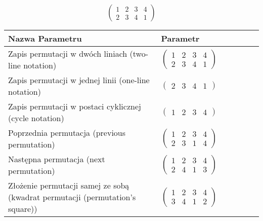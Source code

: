 \documentclass[12pt]{article}
\begin{document}
\subsection{}
\begin{center}
\[
\begin{pmatrix}
	1 & 2 & 3 & 4 \\ 
	2 & 3 & 4 & 1 
\end{pmatrix}
\]

\begin{tabular}{|m{0.6\linewidth}|m{0.4\linewidth}|}
	\hline
	Nazwa Parametru & Parametr \\
	\hline
	Zapis permutacji w dwóch liniach (two-line notation) & $\begin{pmatrix} 1 & 2 & 3 & 4 \\ 
2 & 3 & 4 & 1 \end{pmatrix}$ \\ 
	\hline
	Zapis permutacji w jednej linii (one-line notation) & $\begin{pmatrix} 2 & 3 & 4 & 1 \end{pmatrix}$ \\ 
	\hline
	Zapis permutacji w postaci cyklicznej (cycle notation) & $\begin{pmatrix} 1 & 2 & 3 & 4 \end{pmatrix} $ \\ 
	\hline
	Poprzednia permutacja (previous permutation) & $\begin{pmatrix} 1 & 2 & 3 & 4 \\ 
2 & 3 & 1 & 4 \end{pmatrix}$ \\ 
	\hline
	Następna permutacja (next permutation) & $\begin{pmatrix} 1 & 2 & 3 & 4 \\ 
2 & 4 & 1 & 3 \end{pmatrix}$ \\ 
	\hline
	Złożenie permutacji samej ze sobą (kwadrat permutacji (permutation's square)) & $\begin{pmatrix} 1 & 2 & 3 & 4 \\ 
3 & 4 & 1 & 2 \end{pmatrix}$ \\ 
	\hline
\end{tabular}
\end{center}
\end{document}
